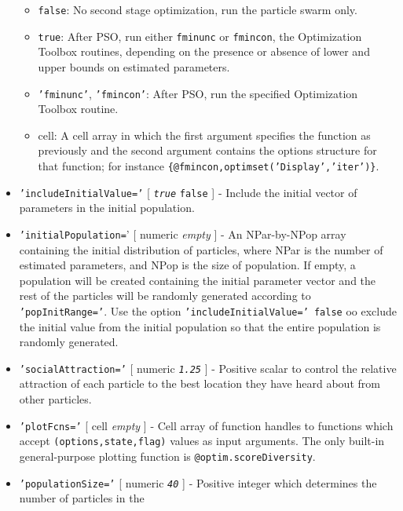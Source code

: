 \begin{itemize}
   \begin{itemize}
   \item
     \texttt{false}: No second stage optimization, run the particle swarm
     only.
   \item
     \texttt{true}: After PSO, run either \texttt{fminunc} or
     \texttt{fmincon}, the Optimization Toolbox routines, depending on
     the presence or absence of lower and upper bounds on estimated
     parameters.
   \item
     \texttt{'fminunc'}, \texttt{'fmincon'}: After PSO, run the specified
     Optimization Toolbox routine.
   \item
     cell: A cell array in which the first argument specifies the
     function as previously and the second argument contains the options
     structure for that function; for instance
     \texttt{\{@fmincon,optimset('Display','iter')\}}.
   \end{itemize}
 \item
   \texttt{'includeInitialValue='} {[} \emph{\texttt{true}} \textbar{}
   \texttt{false} {]} - Include the initial vector of parameters in the
   initial population.
 \item
   \texttt{'initialPopulation=}' {[} numeric \textbar{} \emph{empty} {]}
   - An NPar-by-NPop array containing the initial distribution of
   particles, where NPar is the number of estimated parameters, and NPop
   is the size of population. If empty, a population will be created
   containing the initial parameter vector and the rest of the particles
   will be randomly generated according to \texttt{'popInitRange='}. Use
   the option \texttt{'includeInitialValue=' false} oo exclude the
   initial value from the initial population so that the entire
   population is randomly generated.
 \item
   \texttt{'socialAttraction='} {[} numeric \textbar{}
   \emph{\texttt{1.25}} {]} - Positive scalar to control the relative
   attraction of each particle to the best location they have heard about
   from other particles.
 \item
   \texttt{'plotFcns='} {[} cell \textbar{} \emph{empty} {]} - Cell array
   of function handles to functions which accept
   \texttt{(options,state,flag)} values as input arguments. The only
   built-in general-purpose plotting function is
   \texttt{@optim.scoreDiversity}.
 \item
   \texttt{'populationSize='} {[} numeric \textbar{} \emph{\texttt{40}}
   {]} - Positive integer which determines the number of particles in the

\end{itemize}
